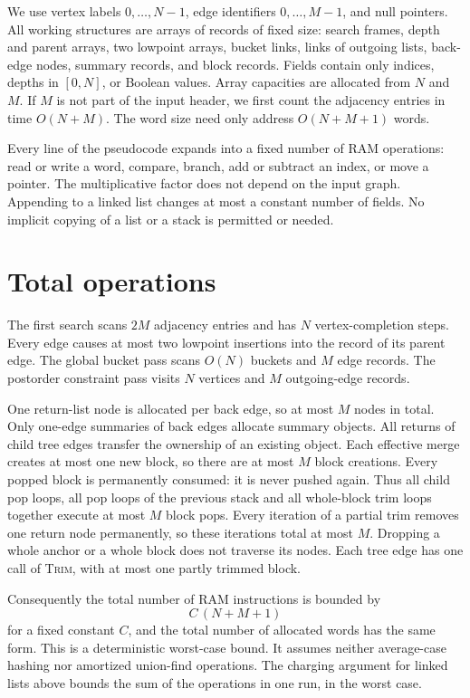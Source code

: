 \documentclass[11pt]{article}
\newcommand{\pr}[1]{\textsc{#1}}
\begin{document}
We use vertex labels $0,\ldots,N-1$, edge identifiers $0,\ldots,M-1$, and null
pointers. All working structures are arrays of records of fixed size: search
frames, depth and parent arrays, two lowpoint arrays, bucket links, links of
outgoing lists, back-edge nodes, summary records, and block records. Fields
contain only indices, depths in $[0,N]$, or Boolean values. Array capacities
are allocated from $N$ and $M$. If $M$ is not part of the input header, we
first count the adjacency entries in time $O(N+M)$. The word size need only
address $O(N+M+1)$ words.

Every line of the pseudocode expands into a fixed number of RAM operations:
read or write a word, compare, branch, add or subtract an index, or move a
pointer. The multiplicative factor does not depend on the input graph. Appending
to a linked list changes at most a constant number of fields. No implicit
copying of a list or a stack is permitted or needed.

\section{Total operations}

The first search scans $2M$ adjacency entries and has $N$ vertex-completion
steps. Every edge causes at most two lowpoint insertions into the record of
its parent edge. The global bucket pass scans $O(N)$ buckets and $M$ edge
records. The postorder constraint pass visits $N$ vertices and $M$
outgoing-edge records.

One return-list node is allocated per back edge, so at most $M$ nodes in total.
Only one-edge summaries of back edges allocate summary objects. All returns of
child tree edges transfer the ownership of an existing object. Each effective
merge creates at most one new block, so there are at most $M$ block creations.
Every popped block is permanently consumed: it is never pushed again. Thus all
child pop loops, all pop loops of the previous stack and all whole-block trim
loops together execute at most $M$ block pops. Every iteration of a partial
trim removes one return node permanently, so these iterations total at most
$M$. Dropping a whole anchor or a whole block does not traverse its nodes. Each
tree edge has one call of \pr{Trim}, with at most one partly trimmed block.

Consequently the total number of RAM instructions is bounded by
\begin{equation*}
C\,(N+M+1)
\end{equation*}
for a fixed constant $C$, and the total number of allocated words has the same
form. This is a deterministic worst-case bound. It assumes neither average-case
hashing nor amortized union-find operations. The charging argument for linked
lists above bounds the sum of the operations in one run, in the worst case.
\end{document}
